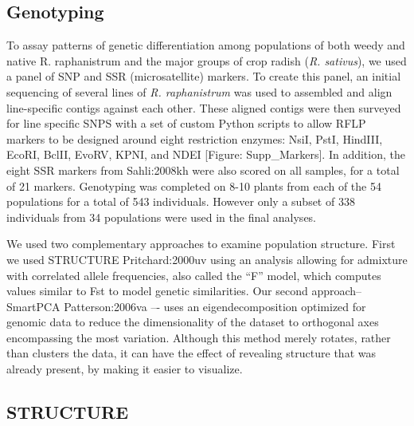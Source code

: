 \documentclass[twocolumn]{bmcart}%
\begin{document}
\subsection*{Genotyping}

To assay patterns of genetic differentiation among populations of both weedy and native R. raphanistrum and the major groups of crop radish (\textit{R. sativus}), we used a panel of SNP and SSR (microsatellite) markers. To create this panel, an initial sequencing of several lines of \textit{R. raphanistrum} was used to assembled and align line-specific contigs against each other. These aligned contigs were then surveyed for line specific SNPS with a set of custom Python scripts to allow RFLP markers to be designed around eight restriction enzymes: NsiI, PstI, HindIII, EcoRI, BclII, EvoRV, KPNI, and NDEI [Figure: Supp\_Markers]. In addition, the eight SSR markers from {Sahli:2008kh} were also scored on all samples, for a total of 21 markers. Genotyping was completed on 8-10 plants from each of the 54 populations for a total of 543 individuals. However only a subset of 338 individuals from 34 populations were used in the final analyses.

We used two complementary approaches to examine population structure. First we used STRUCTURE {Pritchard:2000uv} using an analysis allowing for admixture with correlated allele frequencies, also called the “F” model, which computes values similar to Fst to model genetic similarities. Our second approach–SmartPCA {Patterson:2006va} –- uses an eigendecomposition optimized for genomic data to reduce the dimensionality of the dataset to orthogonal axes encompassing the most variation. Although this method merely rotates, rather than clusters the data, it can have the effect of revealing structure that was already present, by making it easier to visualize.

\subsection*{STRUCTURE}
\end{document}
